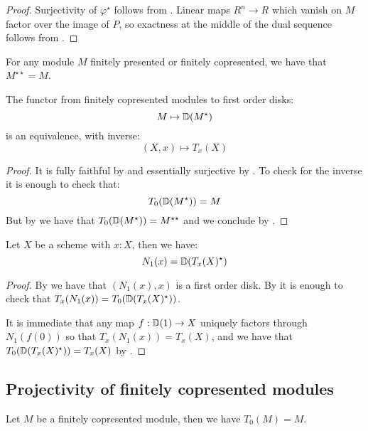\begin{proof}
  Surjectivity of $\varphi^\star$ follows from .
  Linear maps $R^n\to R$ which vanish on $M$ factor over the image of $P$, so exactness at the middle of the dual sequence follows from .
\end{proof}

\begin{corollary}\label{double-dual-identity}
For any module $M$ finitely presented or finitely copresented, we have that $M^{\star\star}=M$.
\end{corollary}

\begin{lemma}\label{equivalence-modules-disks}
  The functor from finitely copresented modules to first order disks:
  \[M\mapsto \mathbb{D}(M^\star)\]
  is an equivalence, with inverse:
  \[(X,x)\mapsto T_x(X)\]
\end{lemma}

\begin{proof}
It is fully faithful by  and essentially surjective by . To check for the inverse it is enough to check that:
\[T_0(\mathbb{D}(M^\star)) = M\]
But by  we have that $T_0(\mathbb{D}(M^\star)) = M^{\star\star}$ and we conclude by .
\end{proof}

\begin{lemma}\label{duality-infinitesimal-tangent}
Let $X$ be a scheme with $x:X$, then we have:
\[N_1(x) = \mathbb{D}(T_x(X)^\star)\]
\end{lemma}

\begin{proof}
By  we have that $(N_1(x),x)$ is a first order disk. By  it is enough to check that $T_x(N_1(x)) = T_0(\mathbb{D}(T_x(X)^\star))$. 

It is immediate that any map $f:\mathbb{D}(1)\to X$ uniquely factors through $N_1(f(0))$ so that $T_x(N_1(x)) = T_x(X)$, and we have that $T_0(\mathbb{D}(T_x(X)^\star)) = T_x(X)$ by .
\end{proof}


\subsection{Projectivity of finitely copresented modules}

\begin{lemma}\label{tangent-copresented-modules}
Let $M$ be a finitely copresented module, then we have $T_0(M) = M$.
\end{lemma}

